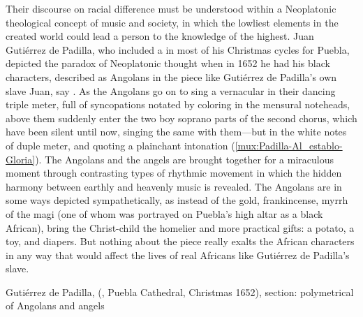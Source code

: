 Their discourse on racial difference must be understood within a Neoplatonic
theological concept of music and society, in which the lowliest elements in the
created world could lead a person to the knowledge of the highest.
Juan Gutiérrez de Padilla, who included a  in most of
his Christmas cycles for Puebla, depicted the paradox of Neoplatonic thought
when in 1652 he had his black characters, described as Angolans in the piece
like Gutiérrez de Padilla's own slave Juan, say .
As the Angolans go on to sing a vernacular  in their
dancing triple meter, full of syncopations notated by coloring in the mensural
noteheads, above them suddenly enter the two boy soprano parts of the second
chorus, which have been silent until now, singing the same  with
them---but in the white notes of duple meter, and quoting a plainchant
intonation (\cref{mux:Padilla-Al_establo-Gloria}).
The Angolans and the angels are brought together for a miraculous moment
through contrasting types of rhythmic movement in which the hidden harmony
between earthly and heavenly music is revealed.
The Angolans are in some ways depicted sympathetically, as instead
of the gold, frankincense, myrrh of the magi (one of whom was portrayed on
Puebla's high altar as a black African), bring the Christ-child the homelier
and more practical gifts: a potato, a toy, and diapers.
But nothing about the piece really exalts the African characters in any way
that would affect the lives of real Africans like Gutiérrez de Padilla's slave.

{Gutiérrez de Padilla,  
(, Puebla Cathedral, Christmas 1652), 
section: polymetrical  of Angolans and angels}

